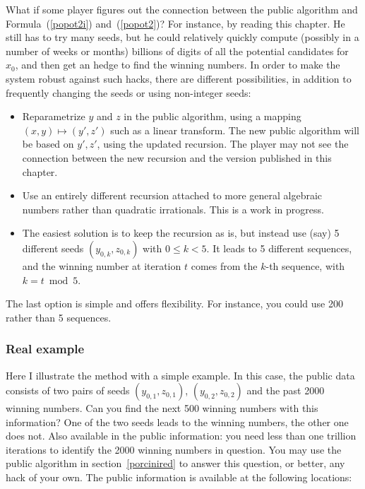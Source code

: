 \documentclass[oneside,10pt]{book}
\begin{document}
What if some player figures out the connection between the public algorithm and Formula~(\ref{popot2i}) and~(\ref{popot2})? For instance, by reading this chapter. He still has to try many seeds, but he could relatively quickly compute (possibly in a number of weeks or months) billions of digits of all the potential candidates for $x_0$, and then get an hedge to find the winning numbers.
In order to make the system robust against such hacks,  there are different possibilities, in addition to frequently changing the seeds or using non-integer seeds: \vspace{1ex}
\begin{itemize}
\item Reparametrize $y$ and $z$ in the public algorithm, using a mapping $(x, y) \mapsto (y',z')$
 such as a linear transform. The new public algorithm will be  based on $y', z'$, using the updated recursion. The player may not see the connection between the new recursion and the version published in this chapter.
\item Use an entirely different recursion attached to more general algebraic numbers rather than quadratic irrationals. This is a work in progress.
\item The easiest solution is to keep the recursion as is, but instead use (say) 5 different seeds $(y_{0,k},z_{0,k})$ with 
$0\leq k < 5$. It leads to 5 different sequences, and the winning number at iteration $t$ comes from the $k$-th
 sequence, with $k = t \bmod 5$.
\end{itemize}\vspace{1ex}
The last option is simple and offers flexibility. For instance, you could use 200 rather than 5 sequences.

\subsubsection{Real example}
 
Here I illustrate the method with a simple example. In this case, the public data consists of two pairs of seeds
 $(y_{0,1}, z_{0,1})$, $(y_{0,2}, z_{0,2})$ and the past 2000 winning numbers. Can you find the next 500 winning numbers with this information? One of the two seeds leads to the winning numbers, the other one does not. Also available in the public information: you need less than one trillion iterations to identify the 2000 winning numbers in question. 
You may use the
 public algorithm in section~\ref{porcinired} to answer this question, or better, any hack of your own. The
 public information is available at the following locations: \vspace{1ex}
\end{document}
